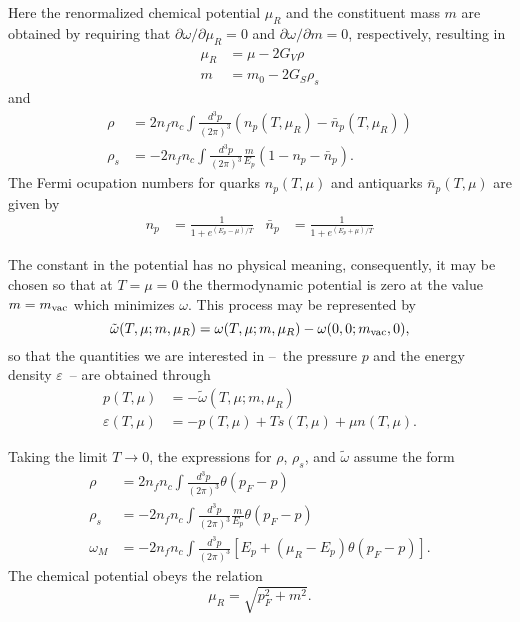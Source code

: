 \documentclass[prc, reprint, amsmath, linenumbers,10pt]{revtex4-1}
\begin{document}
Here the renormalized chemical potential $\mu_R$ and the constituent mass $m$ are obtained by requiring that $\partial \omega / \partial \mu_R = 0$ and $\partial \omega / \partial m = 0$, respectively, resulting in
\begin{align}
	\mu_R &= \mu - 2 G_V \rho \\
	m &= m_0 - 2 G_S \rho_s
\end{align}
%
and
\begin{align}
	\rho &= 2 n_f n_c \int \frac{d^3p}{(2\pi)^3} (n_p(T, \mu_R) - \bar{n}_p(T, \mu_R))\\
	\rho_s &= - 2 n_f n_c \int\frac{d^3p}{(2\pi)^3} \frac{m}{E_p}(1 - n_p -\bar{n}_p).
\end{align}
%
The Fermi ocupation numbers for quarks $n_p(T, \mu)$ and antiquarks $\bar{n}_p(T, \mu)$ are given by
\begin{align}
	n_p &= \frac{1}{1 + e^{(E_p - \mu)/T}} & \bar{n}_p &= \frac{1}{1 + e^{(E_p + \mu)/T}}
\end{align}

The constant in the potential has no physical meaning, consequently, it may be chosen so that at $T = \mu = 0$ the thermodynamic potential is zero at the value $m = m_{\rm{vac}}$ which minimizes $\omega$. This process may be represented by 
\begin{equation}
	\tilde\omega(T, \mu; m, \mu_R) = \omega(T, \mu; m, \mu_R) - \omega(0, 0; m_{\rm{vac}}, 0),
\end{equation}
%
so that the quantities we are interested in --~the pressure $p$ and the energy density $\varepsilon$~-- are obtained through
\begin{align}
		p(T, \mu) &= -\tilde\omega(T, \mu; m, \mu_R) \label{Exp_pressao_T}\\
		\varepsilon(T, \mu) &= -p(T, \mu) + T s(T, \mu) + \mu n(T,\mu). \label{Exp_energia_T}
\end{align}
	
Taking the limit $T \to 0$, the expressions for $\rho$, $\rho_s$, and $\tilde\omega$ assume the form
\begin{align}
	\rho &=  2 n_f n_c \int \frac{d^3p}{(2\pi)^3} \theta(p_F - p)\\
	\rho_s &= - 2 n_f n_c \int\frac{d^3p}{(2\pi)^3} \frac{m}{E_p} \theta(p_F - p)\\
	\omega_M &= -2 n_f n_c \int\frac{d^3p}{(2\pi)^3} [E_p + (\mu_R - E_p)\theta(p_F - p)].
\end{align}
%
The chemical potential obeys the relation
\begin{equation}
	\mu_R = \sqrt{p_F^2 + m^2}.
\end{equation}
\end{document}

